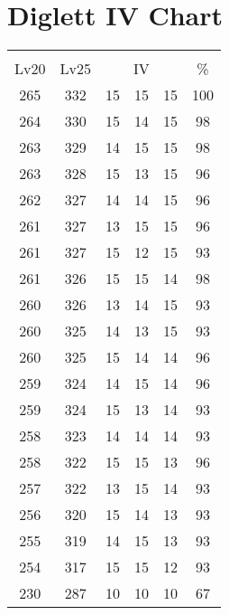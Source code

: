 \documentclass{article}%
\begin{document}
%
\normalsize%
\section{Diglett IV Chart}%
\label{sec:Diglett IV Chart}%
\renewcommand{\arraystretch}{1.5}%
\begin{tabular}{|c|c|c|c|c|c|}%
\hline%
\multicolumn{6}{|c|}{\textcolor{white}{ 
\linebreak{Diglett}
}%
\cellcolor{black}}\\%
\multicolumn{1}{|c}{Lv20}&\multicolumn{1}{c|}{Lv25}&\multicolumn{3}{c|}{IV}&\multicolumn{1}{|c|}{\%}\\%
\hline%
\rowcolor{color100}%
265&332&15&15&15&100\\%
\hline%
\rowcolor{color98}%
264&330&15&14&15&98\\%
\hline%
\rowcolor{color98}%
263&329&14&15&15&98\\%
\hline%
\rowcolor{color96}%
263&328&15&13&15&96\\%
\hline%
\rowcolor{color96}%
262&327&14&14&15&96\\%
\hline%
\rowcolor{color96}%
261&327&13&15&15&96\\%
\hline%
\rowcolor{color93}%
261&327&15&12&15&93\\%
\hline%
\rowcolor{color98}%
261&326&15&15&14&98\\%
\hline%
\rowcolor{color93}%
260&326&13&14&15&93\\%
\hline%
\rowcolor{color93}%
260&325&14&13&15&93\\%
\hline%
\rowcolor{color96}%
260&325&15&14&14&96\\%
\hline%
\rowcolor{color96}%
259&324&14&15&14&96\\%
\hline%
\rowcolor{color93}%
259&324&15&13&14&93\\%
\hline%
\rowcolor{color93}%
258&323&14&14&14&93\\%
\hline%
\rowcolor{color96}%
258&322&15&15&13&96\\%
\hline%
\rowcolor{color93}%
257&322&13&15&14&93\\%
\hline%
\rowcolor{color93}%
256&320&15&14&13&93\\%
\hline%
\rowcolor{color93}%
255&319&14&15&13&93\\%
\hline%
\rowcolor{color93}%
254&317&15&15&12&93\\%
\hline%
\rowcolor{color91}%
230&287&10&10&10&67\\%
\end{tabular}

%
\end{document}
